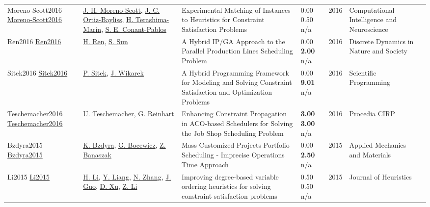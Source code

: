 {\begin{longtable}{p{3cm}p{5cm}p{10cm}p{1cm}rp{2.5cm}l}
Moreno-Scott2016 \href{http://dx.doi.org/10.1155/2016/7349070}{Moreno-Scott2016} & \hyperref[auth:a1783]{J. H. Moreno-Scott}, \hyperref[auth:a1781]{J. C. Ortiz-Bayliss}, \hyperref[auth:a1608]{H. Terashima-Marín}, \hyperref[auth:a1782]{S. E. Conant-Pablos} & \cellcolor{gold!20}Experimental Matching of Instances to Heuristics for Constraint Satisfaction Problems & \noindent{}\textcolor{black!50}{0.00} 0.50 n/a & 2016 & Computational Intelligence and Neuroscience & \cite{Moreno-Scott2016}\\
Ren2016 \href{http://dx.doi.org/10.1155/2016/5201937}{Ren2016} & \hyperref[auth:a1249]{H. Ren}, \hyperref[auth:a1611]{S. Sun} & \cellcolor{gold!20}A Hybrid IP/GA Approach to the Parallel Production Lines Scheduling Problem & \noindent{}\textcolor{black!50}{0.00} \textbf{2.00} n/a & 2016 & Discrete Dynamics in Nature and Society & \cite{Ren2016}\\
Sitek2016 \href{http://dx.doi.org/10.1155/2016/5102616}{Sitek2016} & \hyperref[auth:a1475]{P. Sitek}, \hyperref[auth:a1476]{J. Wikarek} & \cellcolor{gold!20}A Hybrid Programming Framework for Modeling and Solving Constraint Satisfaction and Optimization Problems & \noindent{}\textcolor{black!50}{0.00} \textbf{9.01} n/a & 2016 & Scientific Programming & \cite{Sitek2016}\\
Teschemacher2016 \href{http://dx.doi.org/10.1016/j.procir.2015.12.071}{Teschemacher2016} & \hyperref[auth:a1905]{U. Teschemacher}, \hyperref[auth:a1906]{G. Reinhart} & \cellcolor{gold!20}Enhancing Constraint Propagation in ACO-based Schedulers for Solving the Job Shop Scheduling Problem & \noindent{}\textbf{3.00} \textbf{3.00} n/a & 2016 & Procedia CIRP & \cite{Teschemacher2016}\\
Bzdyra2015 \href{http://dx.doi.org/10.4028/www.scientific.net/amm.791.70}{Bzdyra2015} & \hyperref[auth:a1813]{K. Bzdyra}, \hyperref[auth:a630]{G. Bocewicz}, \hyperref[auth:a1814]{Z. Banaszak} & Mass Customized Projects Portfolio Scheduling - Imprecise Operations Time Approach & \noindent{}\textcolor{black!50}{0.00} \textbf{2.50} n/a & 2015 & Applied Mechanics and Materials & \cite{Bzdyra2015}\\
Li2015 \href{http://dx.doi.org/10.1007/s10732-015-9305-2}{Li2015} & \hyperref[auth:a1796]{H. Li}, \hyperref[auth:a1797]{Y. Liang}, \hyperref[auth:a1798]{N. Zhang}, \hyperref[auth:a1799]{J. Guo}, \hyperref[auth:a1800]{D. Xu}, \hyperref[auth:a1801]{Z. Li} & Improving degree-based variable ordering heuristics for solving constraint satisfaction problems & \noindent{}0.50 0.50 n/a & 2015 & Journal of Heuristics & \cite{Li2015}\\

\end{longtable}}
